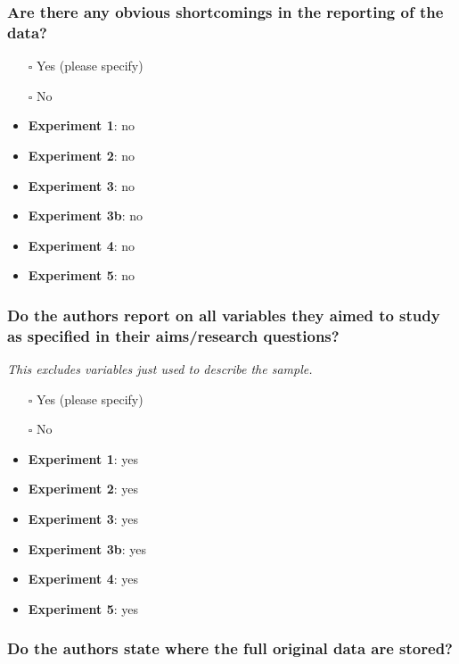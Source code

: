 \documentclass[
  doc, a4paper]{apa7}
\begin{document}
\subsubsection{Are there any obvious shortcomings in the reporting of the data?}\label{are-there-any-obvious-shortcomings-in-the-reporting-of-the-data}

\begin{itemize}
\item[$\square$]
  Yes (please specify)
\item[$\square$]
  No
\item
  \textbf{Experiment 1}: no\\
\item
  \textbf{Experiment 2}: no
\item
  \textbf{Experiment 3}: no
\item
  \textbf{Experiment 3b}: no
\item
  \textbf{Experiment 4}: no
\item
  \textbf{Experiment 5}: no
\end{itemize}

\subsubsection{Do the authors report on all variables they aimed to study as specified in their aims/research questions?}\label{do-the-authors-report-on-all-variables-they-aimed-to-study-as-specified-in-their-aimsresearch-questions}

\emph{This excludes variables just used to describe the sample.}

\begin{itemize}
\item[$\square$]
  Yes (please specify)
\item[$\square$]
  No
\item
  \textbf{Experiment 1}: yes\\
\item
  \textbf{Experiment 2}: yes
\item
  \textbf{Experiment 3}: yes
\item
  \textbf{Experiment 3b}: yes
\item
  \textbf{Experiment 4}: yes
\item
  \textbf{Experiment 5}: yes
\end{itemize}

\subsubsection{Do the authors state where the full original data are stored?}\label{do-the-authors-state-where-the-full-original-data-are-stored}
\end{document}
